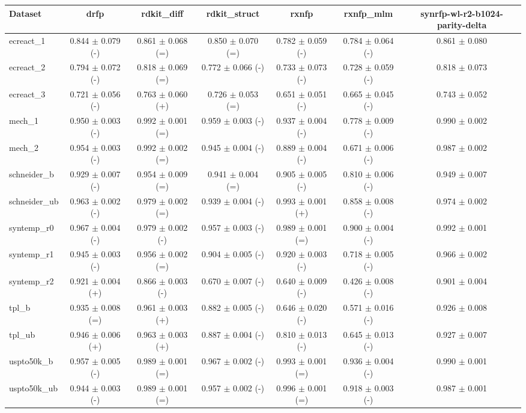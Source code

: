 \begin{tabular}{lcccccc}
\toprule
Dataset & drfp & rdkit\_diff & rdkit\_struct & rxnfp & rxnfp\_mlm & synrfp-wl-r2-b1024-parity-delta \\
\midrule
ecreact\_1 & 0.844 $\pm$ 0.079 (-) & 0.861 $\pm$ 0.068 (=) & 0.850 $\pm$ 0.070 (=) & 0.782 $\pm$ 0.059 (-) & 0.784 $\pm$ 0.064 (-) & 0.861 $\pm$ 0.080 \\
ecreact\_2 & 0.794 $\pm$ 0.072 (-) & 0.818 $\pm$ 0.069 (=) & 0.772 $\pm$ 0.066 (-) & 0.733 $\pm$ 0.073 (-) & 0.728 $\pm$ 0.059 (-) & 0.818 $\pm$ 0.073 \\
ecreact\_3 & 0.721 $\pm$ 0.056 (-) & 0.763 $\pm$ 0.060 (+) & 0.726 $\pm$ 0.053 (=) & 0.651 $\pm$ 0.051 (-) & 0.665 $\pm$ 0.045 (-) & 0.743 $\pm$ 0.052 \\
mech\_1 & 0.950 $\pm$ 0.003 (-) & 0.992 $\pm$ 0.001 (=) & 0.959 $\pm$ 0.003 (-) & 0.937 $\pm$ 0.004 (-) & 0.778 $\pm$ 0.009 (-) & 0.990 $\pm$ 0.002 \\
mech\_2 & 0.954 $\pm$ 0.003 (-) & 0.992 $\pm$ 0.002 (=) & 0.945 $\pm$ 0.004 (-) & 0.889 $\pm$ 0.004 (-) & 0.671 $\pm$ 0.006 (-) & 0.987 $\pm$ 0.002 \\
schneider\_b & 0.929 $\pm$ 0.007 (-) & 0.954 $\pm$ 0.009 (=) & 0.941 $\pm$ 0.004 (=) & 0.905 $\pm$ 0.005 (-) & 0.810 $\pm$ 0.006 (-) & 0.949 $\pm$ 0.007 \\
schneider\_ub & 0.963 $\pm$ 0.002 (-) & 0.979 $\pm$ 0.002 (=) & 0.939 $\pm$ 0.004 (-) & 0.993 $\pm$ 0.001 (+) & 0.858 $\pm$ 0.008 (-) & 0.974 $\pm$ 0.002 \\
syntemp\_r0 & 0.967 $\pm$ 0.004 (-) & 0.979 $\pm$ 0.002 (-) & 0.957 $\pm$ 0.003 (-) & 0.989 $\pm$ 0.001 (=) & 0.900 $\pm$ 0.004 (-) & 0.992 $\pm$ 0.001 \\
syntemp\_r1 & 0.945 $\pm$ 0.003 (-) & 0.956 $\pm$ 0.002 (=) & 0.904 $\pm$ 0.005 (-) & 0.920 $\pm$ 0.003 (-) & 0.718 $\pm$ 0.005 (-) & 0.966 $\pm$ 0.002 \\
syntemp\_r2 & 0.921 $\pm$ 0.004 (+) & 0.866 $\pm$ 0.003 (-) & 0.670 $\pm$ 0.007 (-) & 0.640 $\pm$ 0.009 (-) & 0.426 $\pm$ 0.008 (-) & 0.901 $\pm$ 0.004 \\
tpl\_b & 0.935 $\pm$ 0.008 (=) & 0.961 $\pm$ 0.003 (+) & 0.882 $\pm$ 0.005 (-) & 0.646 $\pm$ 0.020 (-) & 0.571 $\pm$ 0.016 (-) & 0.926 $\pm$ 0.008 \\
tpl\_ub & 0.946 $\pm$ 0.006 (+) & 0.963 $\pm$ 0.003 (+) & 0.887 $\pm$ 0.004 (-) & 0.810 $\pm$ 0.013 (-) & 0.645 $\pm$ 0.013 (-) & 0.927 $\pm$ 0.007 \\
uspto50k\_b & 0.957 $\pm$ 0.005 (-) & 0.989 $\pm$ 0.001 (=) & 0.967 $\pm$ 0.002 (-) & 0.993 $\pm$ 0.001 (=) & 0.936 $\pm$ 0.004 (-) & 0.990 $\pm$ 0.001 \\
uspto50k\_ub & 0.944 $\pm$ 0.003 (-) & 0.989 $\pm$ 0.001 (=) & 0.957 $\pm$ 0.002 (-) & 0.996 $\pm$ 0.001 (=) & 0.918 $\pm$ 0.003 (-) & 0.987 $\pm$ 0.001 \\
\bottomrule
\end{tabular}
